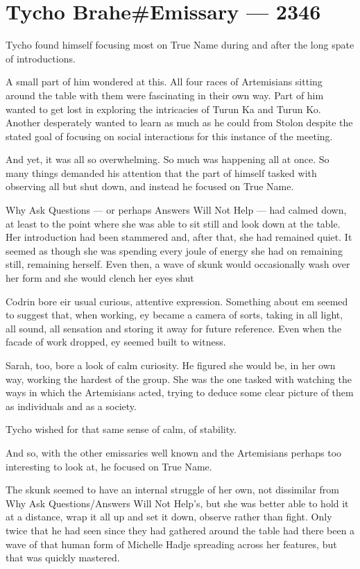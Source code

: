 \hypertarget{tycho-braheemissary-2346}{%
\chapter{Tycho Brahe\#Emissary — 2346}\label{tycho-braheemissary-2346}}

Tycho found himself focusing most on True Name during and after the long spate of introductions.

A small part of him wondered at this. All four races of Artemisians sitting around the table with them were fascinating in their own way. Part of him wanted to get lost in exploring the intricacies of Turun Ka and Turun Ko. Another desperately wanted to learn as much as he could from Stolon despite the stated goal of focusing on social interactions for this instance of the meeting.

And yet, it was all so overwhelming. So much was happening all at once. So many things demanded his attention that the part of himself tasked with observing all but shut down, and instead he focused on True Name.

Why Ask Questions — or perhaps Answers Will Not Help — had calmed down, at least to the point where she was able to sit still and look down at the table. Her introduction had been stammered and, after that, she had remained quiet. It seemed as though she was spending every joule of energy she had on remaining still, remaining herself. Even then, a wave of skunk would occasionally wash over her form and she would clench her eyes shut

Codrin bore eir usual curious, attentive expression. Something about em seemed to suggest that, when working, ey became a camera of sorts, taking in all light, all sound, all sensation and storing it away for future reference. Even when the facade of work dropped, ey seemed built to witness.

Sarah, too, bore a look of calm curiosity. He figured she would be, in her own way, working the hardest of the group. She was the one tasked with watching the ways in which the Artemisians acted, trying to deduce some clear picture of them as individuals and as a society.

Tycho wished for that same sense of calm, of stability.

And so, with the other emissaries well known and the Artemisians perhaps too interesting to look at, he focused on True Name.

The skunk seemed to have an internal struggle of her own, not dissimilar from Why Ask Questions/Answers Will Not Help's, but she was better able to hold it at a distance, wrap it all up and set it down, observe rather than fight. Only twice that he had seen since they had gathered around the table had there been a wave of that human form of Michelle Hadje spreading across her features, but that was quickly mastered.

